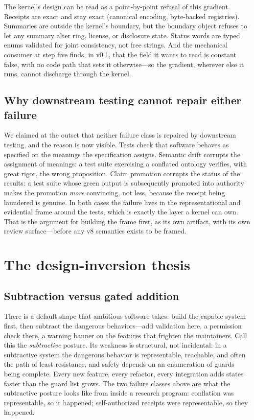 The kernel's design can be read as a point-by-point refusal of this
gradient. Receipts are exact and stay exact (canonical encoding,
byte-backed registries). Summaries are outside the kernel's boundary,
but the boundary object refuses to let any summary alter ring, license,
or disclosure state. Status words are typed enums validated for joint
consistency, not free strings. And the mechanical consumer at step five
finds, in v0.1, that the field it wants to read is constant false, with
no code path that sets it otherwise---so the gradient, wherever else it
runs, cannot discharge through the kernel.

\subsection{Why downstream testing cannot repair either failure}\label{ch01:norepair}

We claimed at the outset that neither failure class is repaired by
downstream testing, and the reason is now visible. Tests check that
software behaves as specified on the meanings the specification assigns.
Semantic drift corrupts the assignment of meanings: a test suite exercising
a conflated ontology verifies, with great rigor, the wrong proposition.
Claim promotion corrupts the status of the results: a test suite whose
green output is subsequently promoted into authority makes the promotion
\emph{more} convincing, not less, because the receipt being laundered is
genuine. In both cases the failure lives in the representational and
evidential frame around the tests, which is exactly the layer a kernel can
own. That is the argument for building the frame first, as its own
artifact, with its own review surface---before any v8 semantics exists to
be framed.

\section{The design-inversion thesis}\label{ch01:inversion}

\subsection{Subtraction versus gated addition}\label{ch01:subtraction}

There is a default shape that ambitious software takes: build the
capable system first, then subtract the dangerous behaviors---add
validation here, a permission check there, a warning banner on the
features that frighten the maintainers. Call this the \emph{subtractive}
posture. Its weakness is structural, not incidental: in a subtractive
system the dangerous behavior is representable, reachable, and often the
path of least resistance, and safety depends on an enumeration of guards
being complete. Every new feature, every refactor, every integration adds
states faster than the guard list grows. The two failure classes above are
what the subtractive posture looks like from inside a research program:
conflation was representable, so it happened; self-authorized receipts
were representable, so they happened.

